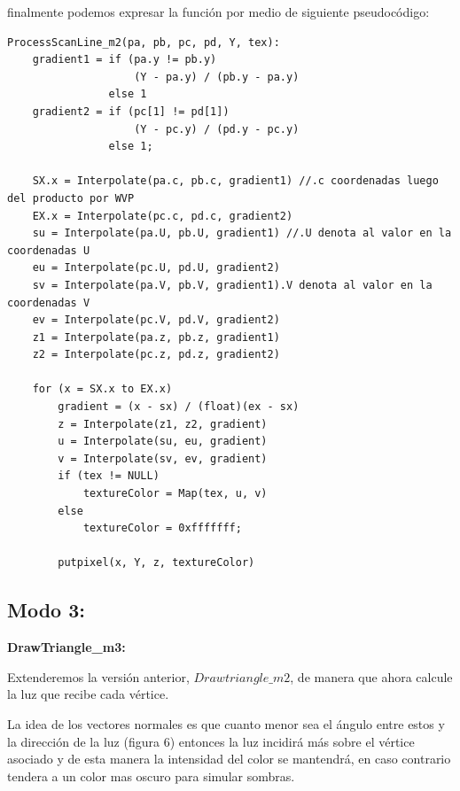 \documentclass[a4paper]{article}
\newcounter{col}
\begin{document}
\par finalmente podemos expresar la función por medio de siguiente pseudocódigo: 
\begin{verbatim}
ProcessScanLine_m2(pa, pb, pc, pd, Y, tex):
    gradient1 = if (pa.y != pb.y) 
                    (Y - pa.y) / (pb.y - pa.y)
                else 1                          
    gradient2 = if (pc[1] != pd[1]) 
                    (Y - pc.y) / (pd.y - pc.y)
                else 1;
            
    SX.x = Interpolate(pa.c, pb.c, gradient1) //.c coordenadas luego del producto por WVP
    EX.x = Interpolate(pc.c, pd.c, gradient2)
    su = Interpolate(pa.U, pb.U, gradient1) //.U denota al valor en la coordenadas U
    eu = Interpolate(pc.U, pd.U, gradient2)
    sv = Interpolate(pa.V, pb.V, gradient1).V denota al valor en la coordenadas V
    ev = Interpolate(pc.V, pd.V, gradient2)
    z1 = Interpolate(pa.z, pb.z, gradient1)
    z2 = Interpolate(pc.z, pd.z, gradient2)
   
    for (x = SX.x to EX.x)
        gradient = (x - sx) / (float)(ex - sx)
        z = Interpolate(z1, z2, gradient)
        u = Interpolate(su, eu, gradient)
        v = Interpolate(sv, ev, gradient)
        if (tex != NULL)
            textureColor = Map(tex, u, v)
        else
            textureColor = 0xfffffff;
    
        putpixel(x, Y, z, textureColor)
\end{verbatim}
\subsection{Modo 3:} 


\textbf{DrawTriangle\_m3:} 


        Extenderemos la versión anterior, $Drawtriangle\_m2$, de manera que ahora calcule la luz que recibe cada vértice.
\par La idea de los vectores normales es que cuanto menor sea el ángulo entre estos y la dirección de la luz (figura 6) entonces la luz incidirá más sobre el vértice asociado y de esta manera la intensidad del color se mantendrá, en caso contrario tendera a un color mas oscuro para simular sombras. 
        
\end{document}

